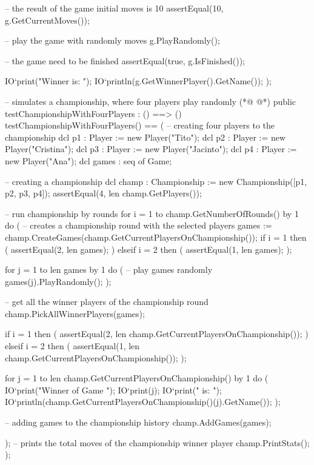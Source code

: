 \begin{vdmpp}[breaklines=true]
    -- the result of the game initial moves is 10
    assertEqual(10, g.GetCurrentMoves());
    
    -- play the game with randomly moves
    g.PlayRandomly();
    
    -- the game need to be finished
    assertEqual(true, g.IsFinished());
    
    IO`print("Winner is: ");
    IO`println(g.GetWinnerPlayer().GetName());
   );
  
  -- simulates a championship, where four players play randomly 
(*@
\label{testChampionshipWithFourPlayers:203}
@*)
  public testChampionshipWithFourPlayers : () ==> ()
   testChampionshipWithFourPlayers() == (
    -- creating four players to the championship
    dcl p1 : Player := new Player("Tito");
    dcl p2 : Player := new Player("Cristina");
    dcl p3 : Player := new Player("Jacinto");
    dcl p4 : Player := new Player("Ana");
    dcl games : seq of Game;
    
    -- creating a championship
    dcl champ : Championship := new Championship([p1, p2, p3, p4]);
    assertEqual(4, len champ.GetPlayers());
    
    -- run championship by rounds
    for i = 1 to champ.GetNumberOfRounds() by 1 do (
     -- creates a championship round with the selected players
     games := champ.CreateGames(champ.GetCurrentPlayersOnChampionship());
     if i = 1
      then (
       assertEqual(2, len games);
      )
     elseif i = 2
      then (
       assertEqual(1, len games);
      );
     
     for j = 1 to len games by 1 do (
      -- play games randomly
      games(j).PlayRandomly();
     );
     
     -- get all the winner players of the championship round
     champ.PickAllWinnerPlayers(games);
     
     if i = 1
      then (
       assertEqual(2, len champ.GetCurrentPlayersOnChampionship());
      )
     elseif i = 2
      then (
       assertEqual(1, len champ.GetCurrentPlayersOnChampionship());
      );
     
     for j = 1 to len champ.GetCurrentPlayersOnChampionship() by 1 do (
      IO`print("Winner of Game ");
      IO`print(j);
      IO`print(" is: ");
      IO`println(champ.GetCurrentPlayersOnChampionship()(j).GetName());
     );
     
     -- adding games to the championship history
     champ.AddGames(games);
     
    );
     -- prints the total moves of the championship winner player 
     champ.PrintStats();
   );
   

\end{vdmpp}
